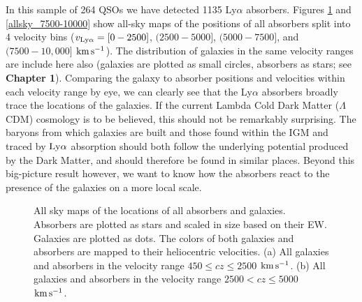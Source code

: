 \documentclass[twocolumn,tighten]{aastex62}
\newcommand{\kms}{$\rm km\, s^{-1}$}
\begin{document}
In this sample of 264 QSOs we have detected 1135 Ly$\alpha$ absorbers. Figures \ref{allsky_2500-5000} and \ref{allsky_7500-10000} show all-sky maps of the positions of all absorbers split into 4 velocity bins ($v_{\rm Ly\alpha} = [0 - 2500]$, $(2500 - 5000]$, $(5000 - 7500]$, and $(7500 - 10,000]$ \kms). The distribution of galaxies in the same velocity ranges are include here also (galaxies are plotted as small circles, absorbers as stars; see \textbf{Chapter 1}). Comparing the galaxy to absorber positions and velocities within each velocity range by eye, we can clearly see that the Ly$\alpha$ absorbers broadly trace the locations of the galaxies. If the current Lambda Cold Dark Matter ($\Lambda$CDM) cosmology is to be believed, this should not be remarkably surprising. The baryons from which galaxies are built and those found within the IGM and traced by $\rm Ly\alpha$ absorption should both follow the underlying potential produced by the Dark Matter, and should therefore be found in similar places. Beyond this big-picture result however, we want to know how the absorbers react to the presence of the galaxies on a more local scale.


\begin{figure}
\centering
  \label{allsky_2500}
  \label{allsky_5000}
  \caption{\small{All sky maps of the locations of all absorbers and galaxies. Absorbers are plotted as stars and scaled in size based on their EW. Galaxies are plotted as dots. The colors of both galaxies and absorbers are mapped to their heliocentric velocities. (a) All galaxies and absorbers in the velocity range $450 \leq cz \leq 2500$ \kms. (b) All galaxies and absorbers in the velocity range $2500 < cz \leq 5000$ \kms.}}
\vspace{0pt}
\label{allsky_2500-5000}
\end{figure}
\end{document}
